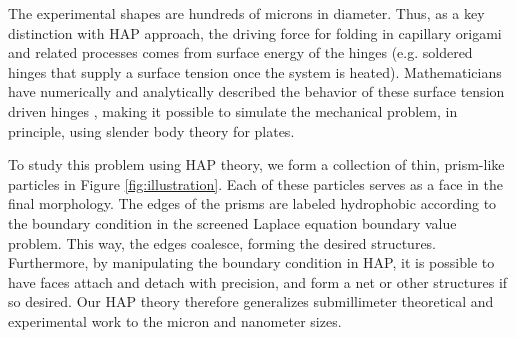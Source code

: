 The experimental shapes are hundreds of microns in diameter. Thus, as a key distinction with HAP approach, the driving force for folding in capillary origami and related processes comes from surface energy of the hinges (e.g. soldered hinges that supply a surface tension once the system is heated). Mathematicians have numerically and analytically described the behavior of these surface tension driven hinges \cite{Bico2018,Peraud2014,Brubaker2016}, making it possible to simulate the mechanical problem, in principle, using slender body theory for plates. 

To study this problem using HAP theory, we form a collection of thin, prism-like particles in Figure \ref{fig:illustration}. 
Each of these particles serves as a face in the final morphology. The edges of the prisms are labeled hydrophobic according to the boundary condition in the screened Laplace equation boundary value problem. This way, the edges coalesce, forming the desired structures. Furthermore, 
by manipulating the boundary condition in HAP, it is possible to have faces attach and detach with precision, and form a net or other structures if so desired. Our HAP theory therefore generalizes submillimeter theoretical and experimental work to the micron and nanometer sizes. 



